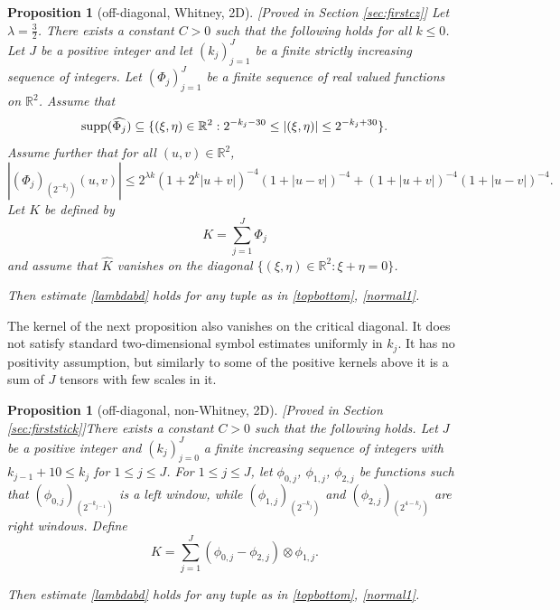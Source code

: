\documentclass[12pt,reqno]{amsart}
\theoremstyle{plain}
\newtheorem{prop}[theorem]{Proposition}
\theoremstyle{definition}
\numberwithin{equation}{section}
\newcommand{\R}{{\mathbb R}}
\begin{document}
 
\begin{prop}[off-diagonal, Whitney, 2D] [Proved in Section \ref{sec:firstcz}] \label{firstcz} 
Let $\lambda=\frac{3}{2}$. There exists a constant $C>0$  such that the following holds for all $k\leq 0$. Let $J$ be a positive integer and let $(k_j)_{j=1}^J$ be a finite 
strictly increasing sequence of integers. Let $(\Phi_j)_{j=1}^J$ be a finite sequence of real valued functions on $\R^2$.
Assume that 
\[\textup{supp}(\widehat{\Phi_j}) \subseteq \{(\xi,\eta)\in \R^2 : 2^{-k_{j}-30}\leq |(\xi,\eta)| \leq 2^{-k_j+30} \}.  \]
Assume further that  for all $(u,v)\in \R^2$, 
\begin{equation}\label{E:phi-lambda3/2}
|(\Phi_j)_{(2^{-k_j})}(u,v)| \leq  2^{\lambda k}(1+2^k|u+v|)^{-4} (1+|u-v|)^{-4} 
+(1+|u+v|)^{-4} (1+|u-v|)^{-4}.
\end{equation}
Let $K$ be defined by
\[
K=\sum_{j=1}^J \Phi_{j}
\]
and assume that $\widehat{K}$ vanishes on the diagonal $\{(\xi,\eta)\in \R^2: \xi+\eta=0\}$.

Then estimate \eqref{lambdabd} holds for any tuple as in \eqref{topbottom}, \eqref{normal1}.
\end{prop}


The kernel of the next proposition also vanishes on the critical diagonal. It does not satisfy standard two-dimensional symbol
estimates uniformly in $k_j$. It has no positivity assumption,
but similarly to some of the positive kernels above it 
is a sum of $J$ tensors 
with few scales in it.


\begin{prop} [off-diagonal, non-Whitney, 2D][Proved in Section \ref{sec:firststick}]\label{firststick} 
There exists a constant $C>0$ such that the following holds.
Let $J$ be a positive integer and $(k_j)_{j=0}^J$   a   finite increasing sequence of integers with $k_{j-1}+10 \le k_{j}$
for $1\le j \leq J$. 
For $1\le j\le J$,  let $\phi_{0,j}$, $\phi_{1,j}$, $\phi_{2,j}$
be functions such that
${(\phi_{0,j})_{(2^{-k_{j-1}})}}$ is a left window, while
${(\phi_{1,j})_{(2^{-k_j})}}$  and 
${(\phi_{2,j})_{(2^{4-k_j})}}$ are right windows.
Define 
\begin{equation}\label{kerfirststick}
K = \sum_{j=1}^J (\phi_{0,j}-\phi_{2,j})\otimes  \phi_{1,j} .  
\end{equation} 

Then estimate \eqref{lambdabd} holds for any tuple as in \eqref{topbottom}, \eqref{normal1}.
 \end{prop}
\end{document}
